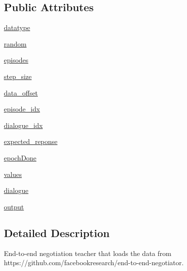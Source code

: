 \subsection*{Public Attributes}
\begin{DoxyCompactItemize}
\item 
\hyperlink{classparlai_1_1tasks_1_1dealnodeal_1_1agents_1_1NegotiationTeacher_abb043d2caeccc2b8adabbf9430a29358}{datatype}
\item 
\hyperlink{classparlai_1_1tasks_1_1dealnodeal_1_1agents_1_1NegotiationTeacher_aa0736462c5c1ba8013fc19d4656cd151}{random}
\item 
\hyperlink{classparlai_1_1tasks_1_1dealnodeal_1_1agents_1_1NegotiationTeacher_a8c9c2ced3114e63cbf19b26e786a2b45}{episodes}
\item 
\hyperlink{classparlai_1_1tasks_1_1dealnodeal_1_1agents_1_1NegotiationTeacher_a54df418efad7f914dca2e031802bad3f}{step\+\_\+size}
\item 
\hyperlink{classparlai_1_1tasks_1_1dealnodeal_1_1agents_1_1NegotiationTeacher_a5cf9fc8dd7c770b3950af19471e9a0de}{data\+\_\+offset}
\item 
\hyperlink{classparlai_1_1tasks_1_1dealnodeal_1_1agents_1_1NegotiationTeacher_a07619bbd0d5ac0571226db6f9ba83702}{episode\+\_\+idx}
\item 
\hyperlink{classparlai_1_1tasks_1_1dealnodeal_1_1agents_1_1NegotiationTeacher_a8c1e3ea8f90824a9c5112307fb880de4}{dialogue\+\_\+idx}
\item 
\hyperlink{classparlai_1_1tasks_1_1dealnodeal_1_1agents_1_1NegotiationTeacher_abda5bf75f9e963c653b446360289c36f}{expected\+\_\+reponse}
\item 
\hyperlink{classparlai_1_1tasks_1_1dealnodeal_1_1agents_1_1NegotiationTeacher_aea616539cf741e95c6fef4ce29d7e83e}{epoch\+Done}
\item 
\hyperlink{classparlai_1_1tasks_1_1dealnodeal_1_1agents_1_1NegotiationTeacher_a9d33952ac00bfe1ca5a4b1f8311dc617}{values}
\item 
\hyperlink{classparlai_1_1tasks_1_1dealnodeal_1_1agents_1_1NegotiationTeacher_a930d7b075d5d107c8523b4a9da3d9998}{dialogue}
\item 
\hyperlink{classparlai_1_1tasks_1_1dealnodeal_1_1agents_1_1NegotiationTeacher_a9e470d44d7f7aee98a40f924e8878853}{output}
\end{DoxyCompactItemize}


\subsection{Detailed Description}
\begin{DoxyVerb}End-to-end negotiation teacher that loads the data from
https://github.com/facebookresearch/end-to-end-negotiator.
\end{DoxyVerb}
 

